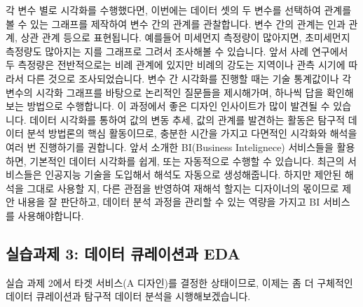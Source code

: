\documentclass[
  letterpaper,
]{book}
\begin{document}
각 변수 별로 시각화를 수행했다면, 이번에는 데이터 셋의 두 변수를
선택하여 관계를 볼 수 있는 그래프를 제작하여 변수 간의 관계를
관찰합니다. 변수 간의 관계는 인과 관계, 상관 관계 등으로 표현됩니다.
예를들어 미세먼지 측정량이 많아지면, 초미세먼지 측정량도 많아지는 지를
그래프로 그려서 조사해볼 수 있습니다. 앞서 사례 연구에서 두 측정량은
전반적으로는 비례 관계에 있지만 비례의 강도는 지역이나 관측 시기에
따라서 다른 것으로 조사되었습니다. 변수 간 시각화를 진행할 때는 기술
통계값이나 각 변수의 시각화 그래프를 바탕으로 논리적인 질문들을
제시해가며, 하나씩 답을 확인해보는 방법으로 수행합니다. 이 과정에서 좋은
디자인 인사이트가 많이 발견될 수 있습니다. 데이터 시각화를 통하여 값의
변동 추세, 값의 관계를 발견하는 활동은 탐구적 데이터 분석 방법론의 핵심
활동이므로, 충분한 시간을 가지고 다면적인 시각화와 해석을 여러 번
진행하기를 권합니다. 앞서 소개한 BI(Business Intelignece) 서비스들을
활용하면, 기본적인 데이터 시각화를 쉽게, 또는 자동적으로 수행할 수
있습니다. 최근의 서비스들은 인공지능 기술을 도입해서 해석도 자동으로
생성해줍니다. 하지만 제안된 해석을 그대로 사용할 지, 다른 관점을
반영하여 재해석 할지는 디자이너의 몫이므로 제안 내용을 잘 판단하고,
데이터 분석 과정을 관리할 수 있는 역량을 가지고 BI 서비스를
사용해야합니다.

\subsection{실습과제 3: 데이터 큐레이션과
EDA}\label{uxc2e4uxc2b5uxacfcuxc81c-3-uxb370uxc774uxd130-uxd050uxb808uxc774uxc158uxacfc-eda}

실습 과제 2에서 타겟 서비스(A 디자인)를 결정한 상태이므로, 이제는 좀 더
구체적인 데이터 큐레이션과 탐구적 데이터 분석을 시행해보겠습니다.
\end{document}
